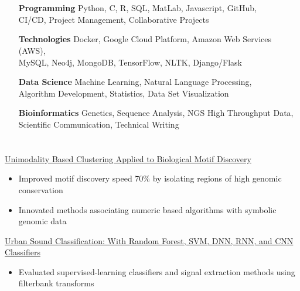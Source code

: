 \documentclass[hidelinks, 11pt]{article}
\begin{document}
\section*{}
\begin{addmargin}{1.6in}
  \begin{itemize}\setlength\itemsep{-4pt}
    \item[{\bf Programming}]{Python, C, R, SQL, MatLab, Javascript, GitHub, \\ 
                             CI/CD, Project Management, Collaborative Projects}
    \item[{\bf Technologies}]{Docker, Google Cloud Platform, Amazon Web Services (AWS), \\
                              MySQL, Neo4j, MongoDB, TensorFlow, NLTK, Django/Flask}
    \item[{\bf Data Science}]{Machine Learning, Natural Language Processing, \\
                              Algorithm Development, Statistics, Data Set Visualization}
    \item[{\bf Bioinformatics}]{Genetics, Sequence Analysis, NGS High Throughput Data, \\
                                Scientific Communication, Technical Writing}
  \end{itemize}
\end{addmargin}
\vspace{-6pt}

\section*{}
\begin{addmargin}{.5in}
  {\href{https://benjamindoran.github.io/motif-paper/}{\color{blue}Unimodality Based Clustering Applied to Biological Motif Discovery}}
  \begin{itemize}\setlength\itemsep{-4pt}
    \item{Improved motif discovery speed 70$\%$ by isolating regions of high genomic conservation} 
    \item{Innovated methods associating numeric based algorithms with symbolic genomic data}
  \end{itemize}
  {\href{https://github.com/BenjaminDoran/Urban-Sound-Classification/}{\color{blue}Urban Sound Classification: With Random Forest, SVM, DNN, RNN, and CNN Classifiers}}
  \begin{itemize}\setlength\itemsep{-4pt}
    \item{Evaluated supervised-learning classifiers and signal extraction methods using filterbank transforms}
  \end{itemize}
\end{addmargin}
\vspace{-6pt}
\end{document}
